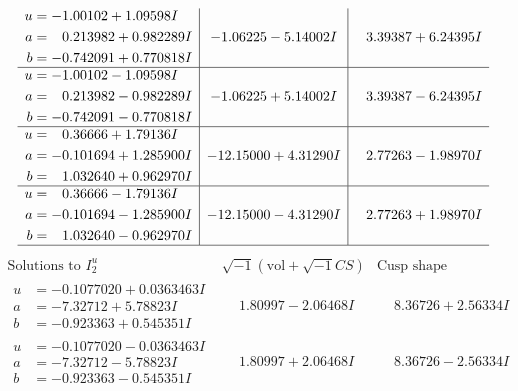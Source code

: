 \documentclass[1p]{elsarticle_modified}
\theoremstyle{definition}
\newcommand{\I}{\sqrt{-1}}
\begin{document}
$$\begin{array}{c|c|c}
\begin{aligned}
u &= -1.00102 + 1.09598 I \\
a &= \phantom{-}0.213982 + 0.982289 I \\
b &= -0.742091 + 0.770818 I\end{aligned}
 & -1.06225 - 5.14002 I & \phantom{-}3.39387 + 6.24395 I \\ \hline\begin{aligned}
u &= -1.00102 - 1.09598 I \\
a &= \phantom{-}0.213982 - 0.982289 I \\
b &= -0.742091 - 0.770818 I\end{aligned}
 & -1.06225 + 5.14002 I & \phantom{-}3.39387 - 6.24395 I \\ \hline\begin{aligned}
u &= \phantom{-}0.36666 + 1.79136 I \\
a &= -0.101694 + 1.285900 I \\
b &= \phantom{-}1.032640 + 0.962970 I\end{aligned}
 & -12.15000 + 4.31290 I & \phantom{-}2.77263 - 1.98970 I \\ \hline\begin{aligned}
u &= \phantom{-}0.36666 - 1.79136 I \\
a &= -0.101694 - 1.285900 I \\
b &= \phantom{-}1.032640 - 0.962970 I\end{aligned}
 & -12.15000 - 4.31290 I & \phantom{-}2.77263 + 1.98970 I\\
 \hline 
 \end{array}$$\newpage$$\begin{array}{c|c|c}  
\text{Solutions to }I^u_{2}& \I (\text{vol} + \sqrt{-1}CS) & \text{Cusp shape}\\
 \hline 
\begin{aligned}
u &= -0.1077020 + 0.0363463 I \\
a &= -7.32712 + 5.78823 I \\
b &= -0.923363 + 0.545351 I\end{aligned}
 & \phantom{-}1.80997 - 2.06468 I & \phantom{-}8.36726 + 2.56334 I \\ \hline\begin{aligned}
u &= -0.1077020 - 0.0363463 I \\
a &= -7.32712 - 5.78823 I \\
b &= -0.923363 - 0.545351 I\end{aligned}
 & \phantom{-}1.80997 + 2.06468 I & \phantom{-}8.36726 - 2.56334 I \\ \hline\begin{aligned}

\end{aligned}
\end{array}$$
\end{document}
